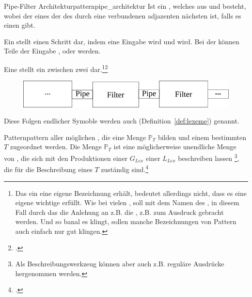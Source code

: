 \begin{Definition}{Pipe-Filter Architekturpattern}{pipe_architektur}
  Ist ein , welches aus  und  besteht, wobei der  eines  der  des durch eine  verbundenen adjazenten nächsten  ist, falls es einen gibt.

  Ein  stellt einen Schritt dar, indem eine Eingabe  wird und  wird. Bei der  können Teile der Eingabe ,  oder  werden.

  Eine  stellt ein  zwischen zwei  dar.\footnote{Das ein  eine eigene Bezeichnung erhält, bedeutet allerdings nicht, dass es eine eigene wichtige  erfüllt. Wie bei vielen , soll mit dem Namen des , in diesem Fall durch das  die Anlehung an z.B. die , z.B.  zum Ausdruck gebracht werden. Und so banal es klingt, sollen manche Bezeichnungen von Pattern auch einfach nur gut klingen.}\footcite{westphal_softwaretechnik_2021}

  \begin{figure}[H]
    \centering
    \includegraphics[width=0.66\linewidth]{./figures/pipe_architecture.png}
  \end{figure}
\end{Definition}

Diese Folgen endlicher Symoble werden auch  (Definition~\ref{def:lexeme}) genannt.

\begin{Definition}{Pattern}{pattern}
   aller möglichen , die eine Menge $\mathbb{P}_{T}$ bilden und einem bestimmten  $T$ zugeordnet werden.
  Die Menge $\mathbb{P}_{T}$ ist eine möglicherweise unendliche Menge von , die sich mit den Produktionen einer  ${G}_{Lex}$ einer  ${L}_{Lex}$ beschreiben lassen \footnote{Als Beschreibungswerkzeug können aber auch z.B. reguläre Ausdrücke hergenommen werden.}, die für die Beschreibung eines  $T$ zuständig sind.\footcite{thiemann_compilerbau_2021}
\end{Definition}


